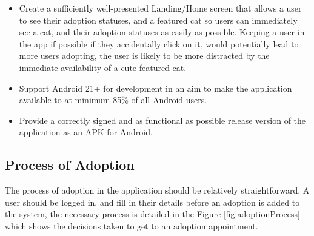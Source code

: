 \begin{itemize}
        \item Create a sufficiently well-presented Landing/Home screen that allows a user to see their adoption statuses, and a featured cat so users can immediately see a cat, and their adoption statuses as easily as possible. Keeping a user in the app if possible if they accidentally click on it, would potentially lead to more users adopting, the user is likely to be more distracted by the immediate availability of a cute featured cat.
        \item Support Android 21+ for development in an aim to make the application available to at minimum 85\% of all Android users.
        \item Provide a correctly signed and as functional as possible release version of the application as an APK for Android.
    \end{itemize}
    
\subsection{Process of Adoption}
The process of adoption in the application should be relatively straightforward. A user should be logged in, and fill in their details before an adoption is added to the system, the necessary process is detailed in the Figure \ref{fig:adoptionProcess} which shows the decisions taken to get to an adoption appointment.

